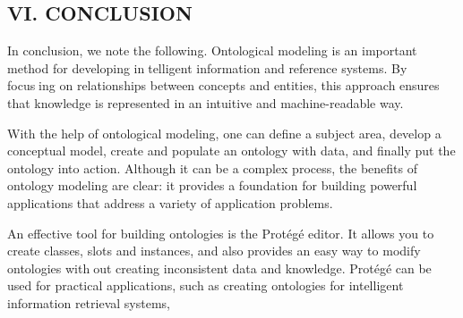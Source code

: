 \documentclass{article}
\begin{document}
\begin{multicols}{2}
\begin{center}
\chapter{VI. CONCLUSION}
\end{center}
\par In conclusion, we note the following. Ontological
modeling is an important method for developing intelligent information and reference systems. By focusing on relationships between concepts and entities, this
approach ensures that knowledge is represented in an
intuitive and machine-readable way.
\par With the help of ontological modeling, one can define
a subject area, develop a conceptual model, create and
populate an ontology with data, and finally put the
ontology into action. Although it can be a complex
process, the benefits of ontology modeling are clear: it
provides a foundation for building powerful applications
that address a variety of application problems.
\par An effective tool for building ontologies is the Protégé
editor. It allows you to create classes, slots and instances,
and also provides an easy way to modify ontologies without creating inconsistent data and knowledge. Protégé
can be used for practical applications, such as creating
ontologies for intelligent information retrieval systems,
\end{multicols}
\clearpage
\end{document}

